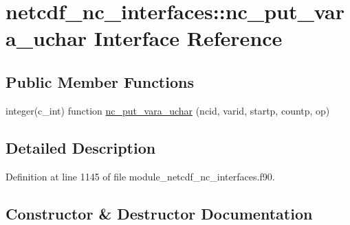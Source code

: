 \hypertarget{interfacenetcdf__nc__interfaces_1_1nc__put__vara__uchar}{}\section{netcdf\+\_\+nc\+\_\+interfaces\+:\+:nc\+\_\+put\+\_\+vara\+\_\+uchar Interface Reference}
\label{interfacenetcdf__nc__interfaces_1_1nc__put__vara__uchar}
\subsection*{Public Member Functions}
\begin{DoxyCompactItemize}
\item 
integer(c\+\_\+int) function \hyperlink{interfacenetcdf__nc__interfaces_1_1nc__put__vara__uchar_a439061a13f45a8a29a48a8af1f8ae6cd}{nc\+\_\+put\+\_\+vara\+\_\+uchar} (ncid, varid, startp, countp, op)
\end{DoxyCompactItemize}


\subsection{Detailed Description}


Definition at line 1145 of file module\+\_\+netcdf\+\_\+nc\+\_\+interfaces.\+f90.



\subsection{Constructor \& Destructor Documentation}
\mbox{\label{interfacenetcdf__nc__interfaces_1_1nc__put__vara__uchar_a439061a13f45a8a29a48a8af1f8ae6cd}} 
